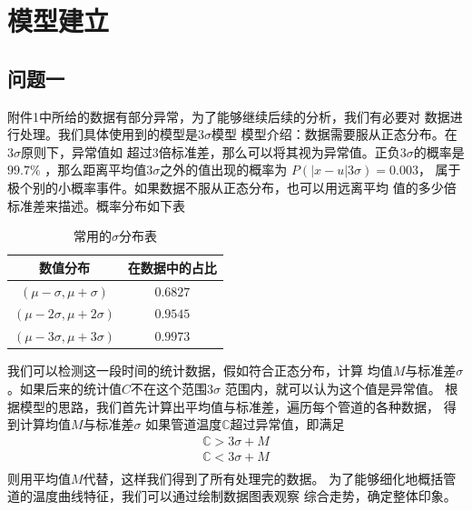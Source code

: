 \section{模型建立}    
    \subsection{问题一}
        附件1中所给的数据有部分异常，为了能够继续后续的分析，我们有必要对
        数据进行处理。我们具体使用到的模型是$3\sigma$模型
        模型介绍：数据需要服从正态分布。在$3\sigma$原则下，异常值如
        超过$3$倍标准差，那么可以将其视为异常值。正负$3\sigma$的概率是$99.7\%$
        ，那么距离平均值$3\sigma$之外的值出现的概率为
        $P(|x-u| 3\sigma) = 0.003$，
        属于极个别的小概率事件。如果数据不服从正态分布，也可以用远离平均
        值的多少倍标准差来描述。概率分布如下表
        \begin{table}[H]
            \centering
            \begin{tabular}{|c|c|}
                \hline
                数值分布&在数据中的占比\\
                \hline
                $(\mu-\sigma,\mu+\sigma)$&$0.6827$\\
                \hline
                $(\mu-2\sigma,\mu+2\sigma)$&$0.9545$\\
                \hline
                $(\mu-3\sigma,\mu+3\sigma)$&$0.9973$\\
                \hline
            \end{tabular}
            \caption{常用的$\sigma$分布表}
        \end{table}
        我们可以检测这一段时间的统计数据，假如符合正态分布，计算
        均值$M$与标准差$\sigma$。如果后来的统计值$C$不在这个范围$3\sigma$
        范围内，就可以认为这个值是异常值。
        根据模型的思路，我们首先计算出平均值与标准差，遍历每个管道的各种数据，
        得到计算均值$M$与标准差$\sigma$
        如果管道温度$\mathbb{C}$超过异常值，即满足
        \begin{equation}
            \begin{aligned}
                \mathbb{C} > 3\sigma + M \\
                \mathbb{C} < 3\sigma + M  \\
            \end{aligned}
        \end{equation}
        则用平均值$M$代替，这样我们得到了所有处理完的数据。
        为了能够细化地概括管道的温度曲线特征，我们可以通过绘制数据图表观察
        综合走势，确定整体印象。
    

